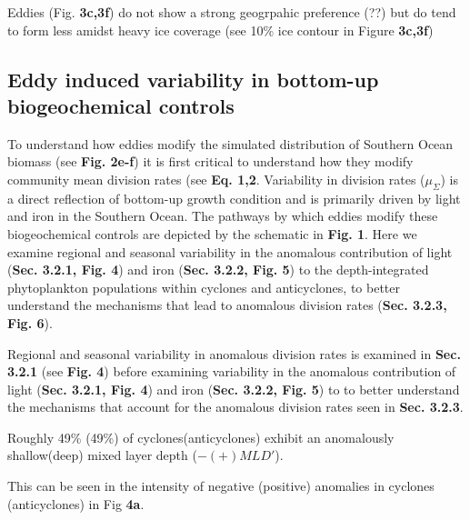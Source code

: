 Eddies (Fig. \textbf{3c,3f}) do not show a strong geogrpahic preference (??) but do tend to form less amidst heavy ice coverage (see 10\% ice contour in  Figure \textbf{3c,3f}) 





\subsection{Eddy induced variability in bottom-up biogeochemical controls}

To understand how eddies modify the simulated distribution of Southern Ocean biomass (see \textbf{Fig. 2e-f}) it is first critical to understand how they modify community mean division rates (see \textbf{Eq. 1,2}. Variability in division rates ($\mu_\Sigma$) is a direct reflection of bottom-up growth condition and is primarily driven by light \parencite{Fauchereauresponsephytoplanktonbiomass2011} and iron \parencite{BoydEnvironmentalFactorsControlling2002} in the Southern Ocean. The pathways by which eddies modify these biogeochemical controls are depicted by the schematic in \textbf{Fig. 1}. Here we examine regional and seasonal variability in the anomalous contribution of light (\textbf{Sec. 3.2.1, Fig. 4}) and iron (\textbf{Sec. 3.2.2, Fig. 5}) to the depth-integrated phytoplankton populations within cyclones and anticyclones, to better understand the mechanisms that lead to anomalous division rates (\textbf{Sec. 3.2.3, Fig.  6}). 

Regional and seasonal variability in anomalous division rates is examined in \textbf{Sec. 3.2.1} (see \textbf{Fig.  4}) before examining variability in the anomalous contribution of light (\textbf{Sec. 3.2.1, Fig. 4}) and iron (\textbf{Sec. 3.2.2, Fig. 5}) to to better understand the mechanisms that account for the anomalous division rates seen in \textbf{Sec. 3.2.3}.






Roughly 49\% (49\%) of cyclones(anticyclones) exhibit an anomalously shallow(deep) mixed layer depth ($-(+) MLD'$).

This can be seen in the intensity of negative (positive) anomalies in cyclones (anticyclones) in Fig \textbf{4a}.

